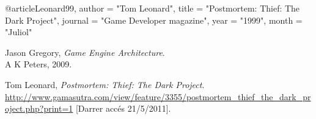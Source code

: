 @article{Leonard99,
    author    = "Tom Leonard",
    title     = "Postmortem: Thief: The Dark Project",
    journal   = "Game Developer magazine",
    year      = "1999",
    month    = "Juliol"
}


\begin{thebibliography}{9}

  Jason Gregory,
  \emph{Game Engine Architecture}.\\
  A K Peters, 2009.

  Tom Leonard, 
  \emph{Postmortem: Thief: The Dark Project}.\\
  \url{http://www.gamasutra.com/view/feature/3355/postmortem_thief_the_dark_project.php?print=1} 
  [Darrer accés 21/5/2011].

\end{thebibliography}
